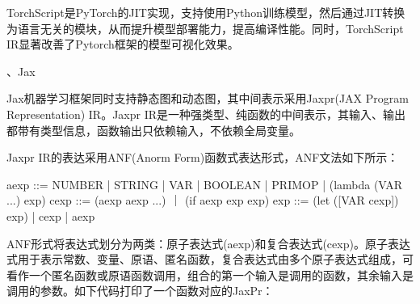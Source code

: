 \documentclass[letterpaper,10pt,english]{sphinxmanual}
\begin{document}
\sphinxAtStartPar
TorchScript是PyTorch的JIT实现，支持使用Python训练模型，然后通过JIT转换为语言无关的模块，从而提升模型部署能力，提高编译性能。同时，TorchScript
IR显著改善了Pytorch框架的模型可视化效果。

、Jax

\sphinxAtStartPar
Jax机器学习框架同时支持静态图和动态图，其中间表示采用Jaxpr(JAX Program
Representation) IR。Jaxpr
IR是一种强类型、纯函数的中间表示，其输入、输出都带有类型信息，函数输出只依赖输入，不依赖全局变量。

\sphinxAtStartPar
Jaxpr IR的表达采用ANF(A\sphinxhyphen{}norm Form)函数式表达形式，ANF文法如下所示：

\begin{sphinxVerbatim}[commandchars=\\\{\}]
\PYGZlt{}aexp\PYGZgt{} ::=  NUMBER | STRING | VAR | BOOLEAN | PRIMOP
           |  (lambda (VAR ...) \PYGZlt{}exp\PYGZgt{})
\PYGZlt{}cexp\PYGZgt{} ::=  (\PYGZlt{}aexp\PYGZgt{} \PYGZlt{}aexp\PYGZgt{} ...)
           ｜ (if \PYGZlt{}aexp\PYGZgt{} \PYGZlt{}exp\PYGZgt{} \PYGZlt{}exp\PYGZgt{})
\PYGZlt{}exp\PYGZgt{} ::=  (let ([VAR \PYGZlt{}cexp\PYGZgt{}]) \PYGZlt{}exp\PYGZgt{}) | \PYGZlt{}cexp\PYGZgt{} | \PYGZlt{}aexp\PYGZgt{}
\end{sphinxVerbatim}

\sphinxAtStartPar
ANF形式将表达式划分为两类：原子表达式(aexp)和复合表达式(cexp)。原子表达式用于表示常数、变量、原语、匿名函数，复合表达式由多个原子表达式组成，可看作一个匿名函数或原语函数调用，组合的第一个输入是调用的函数，其余输入是调用的参数。如下代码打印了一个函数对应的JaxPr：

\begin{sphinxVerbatim}[commandchars=\\\{\}]
   
   

  
          
     

 
\end{sphinxVerbatim}
\end{document}
